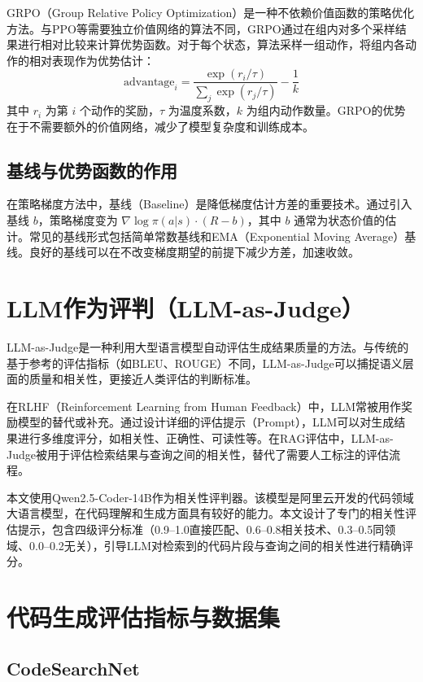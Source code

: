 \documentclass[
    fontset = win, %
  ]{njuthesis}
\begin{document}
GRPO\cite{deepseekmath2024}（Group Relative Policy Optimization）是一种不依赖价值函数的策略优化方法。与PPO\cite{ppo2017}等需要独立价值网络的算法不同，GRPO通过在组内对多个采样结果进行相对比较来计算优势函数。对于每个状态，算法采样一组动作，将组内各动作的相对表现作为优势估计：
\[
\text{advantage}_i = \frac{\exp(r_i / \tau)}{\sum_j \exp(r_j / \tau)} - \frac{1}{k}
\]
其中 $r_i$ 为第 $i$ 个动作的奖励，$\tau$ 为温度系数，$k$ 为组内动作数量。GRPO的优势在于不需要额外的价值网络，减少了模型复杂度和训练成本。

\subsection{基线与优势函数的作用}

在策略梯度方法中，基线（Baseline）是降低梯度估计方差的重要技术。通过引入基线 $b$，策略梯度变为 $\nabla \log \pi(a|s) \cdot (R-b)$，其中 $b$ 通常为状态价值的估计。常见的基线形式包括简单常数基线和EMA（Exponential Moving Average）基线。良好的基线可以在不改变梯度期望的前提下减少方差，加速收敛。

\section{LLM作为评判（LLM-as-Judge）}

LLM-as-Judge是一种利用大型语言模型自动评估生成结果质量的方法。与传统的基于参考的评估指标（如BLEU、ROUGE）不同，LLM-as-Judge可以捕捉语义层面的质量和相关性，更接近人类评估的判断标准。

在RLHF（Reinforcement Learning from Human Feedback）中，LLM常被用作奖励模型的替代或补充。通过设计详细的评估提示（Prompt），LLM可以对生成结果进行多维度评分，如相关性、正确性、可读性等。在RAG评估中，LLM-as-Judge被用于评估检索结果与查询之间的相关性，替代了需要人工标注的评估流程。

本文使用Qwen2.5-Coder-14B作为相关性评判器。该模型是阿里云开发的代码领域大语言模型，在代码理解和生成方面具有较好的能力。本文设计了专门的相关性评估提示，包含四级评分标准（0.9--1.0直接匹配、0.6--0.8相关技术、0.3--0.5同领域、0.0--0.2无关），引导LLM对检索到的代码片段与查询之间的相关性进行精确评分。

\section{代码生成评估指标与数据集}

\subsection{CodeSearchNet}
\end{document}
